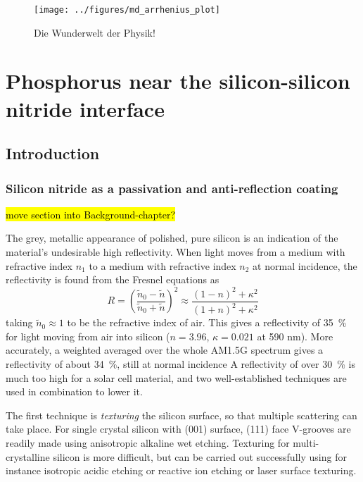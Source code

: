 \documentclass[11pt,bibliography=totoc,index=totoc]{scrbook}   %
\newcommand{\comment}[1]{\hl{#1}}
\begin{document}
\begin{figure}[htbp]
  \begin{center}
    \texttt{[image: ../figures/md\_arrhenius\_plot]}
  \end{center}
  \caption{
    Die Wunderwelt der Physik!
  }
  \label{fig:md_arrhenius_plot}
\end{figure}

\chapter{Phosphorus near the silicon-silicon nitride interface}

\section{Introduction}

\subsection{Silicon nitride as a passivation and anti-reflection coating}
\comment{move section into  Background-chapter?}

The grey, metallic appearance of polished, pure silicon is an indication of the material's undesirable high reflectivity.
When light moves from a medium with refractive index $n_1$ to a medium with refractive index $n_2$ at normal incidence, 
the reflectivity is found from the Fresnel equations as
\begin{equation}
    R = \left(\frac{\tilde{n}_0-\tilde{n}}{\tilde{n}_0+\tilde{n}}\right)^2 \approx
    \frac{(1 - n)^2 + \kappa^2}{(1 + n)^2 + \kappa^2}
  \label{eq:reflectivity}
\end{equation}
taking $\tilde{n}_0\approx 1$ to be the refractive index of air.
This gives a reflectivity of 35~\% for light moving from air into silicon ($n=3.96$, $\kappa=0.021$ at 590 nm\cite{www:refractiveindex-Si}).
More accurately, a weighted averaged over the whole AM1.5G spectrum gives a reflectivity of about 34~\%, still at normal incidence\cite{Macdonald:2004}
A reflectivity of over 30~\% is much too high for a solar cell material, and
two well-established techniques are used in combination to lower it.

The first technique is \emph{texturing} the silicon surface, so that multiple scattering can take place.
For single crystal silicon with (001) surface, (111) face V-grooves are readily made using anisotropic alkaline wet etching.
Texturing for multi-crystalline silicon is more difficult, but can be carried out successfully using for instance
isotropic acidic etching or reactive ion etching\cite{Macdonald:2004,Panek:2005,Koynov:2006} or laser surface texturing\cite{Iyengar:2010}.
\end{document}
